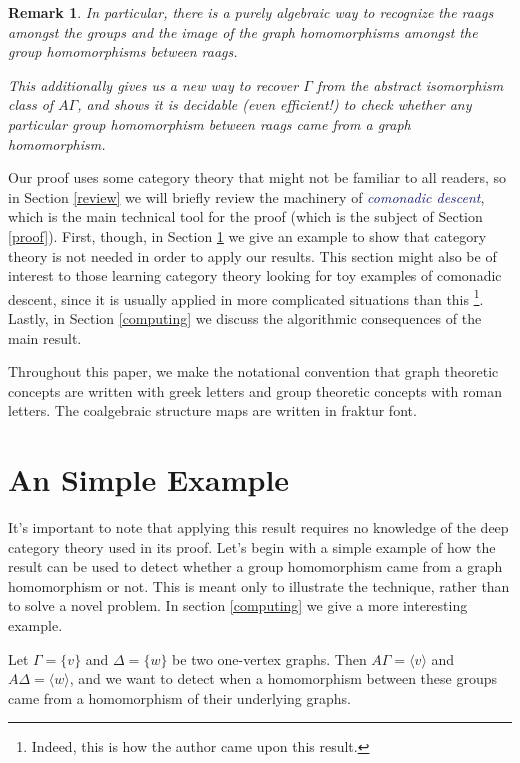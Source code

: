\documentclass[12pt]{article}
\newtheorem*{rmk}{Remark}
\theoremstyle{definition}
\theoremstyle{theorem}
\newcommand*{\important}[1]{\textcolor{MidnightBlue}{\emph{#1}}}
\begin{document}
  \begin{rmk}
    In particular, there is a purely algebraic way to recognize the 
    raags amongst the groups and the image of the graph homomorphisms 
    amongst the group homomorphisms between raags.

    This additionally gives us a new way to recover $\Gamma$ from the 
    abstract isomorphism class of $A \Gamma$, and shows it is 
    decidable (even efficient!) to check whether any particular
    group homomorphism between raags came from a graph homomorphism.
  \end{rmk}

  Our proof uses some category theory that might not be familiar to all
  readers, so in Section \ref{review} we will briefly review the machinery 
  of \important{comonadic descent}, which is the main technical tool for 
  the proof (which is the subject of Section \ref{proof}). 
  First, though, in Section \ref{eg} we give an example to show that 
  category theory is not needed in order to apply our results.
  This section might also be of interest to 
  those learning category theory looking for toy examples of comonadic descent, 
  since it is usually applied in more complicated situations than this%
  \footnote{Indeed, this is how the author came upon this result.}. 
  Lastly, in Section \ref{computing} we discuss the algorithmic consequences 
  of the main result.

  Throughout this paper, we make the notational convention that graph theoretic 
  concepts are written with greek letters and group theoretic concepts with 
  roman letters. The coalgebraic structure maps are written in fraktur font.

\section{An Simple Example}
\label{eg}

It's important to note that applying this result requires no knowledge of 
the deep category theory used in its proof. Let's begin with a simple example
of how the result can be used to detect whether a group 
homomorphism came from a graph homomorphism or not. This is meant only to 
illustrate the technique, rather than to solve a novel problem. In section
\ref{computing} we give a more interesting example.

Let $\Gamma = \{ v \}$ and $\Delta = \{ w \}$ be two one-vertex graphs.
Then $A \Gamma = \langle v \rangle$ and $A \Delta = \langle w \rangle$,
and we want to detect when a homomorphism between these groups came from a
homomorphism of their underlying graphs.
\end{document}
